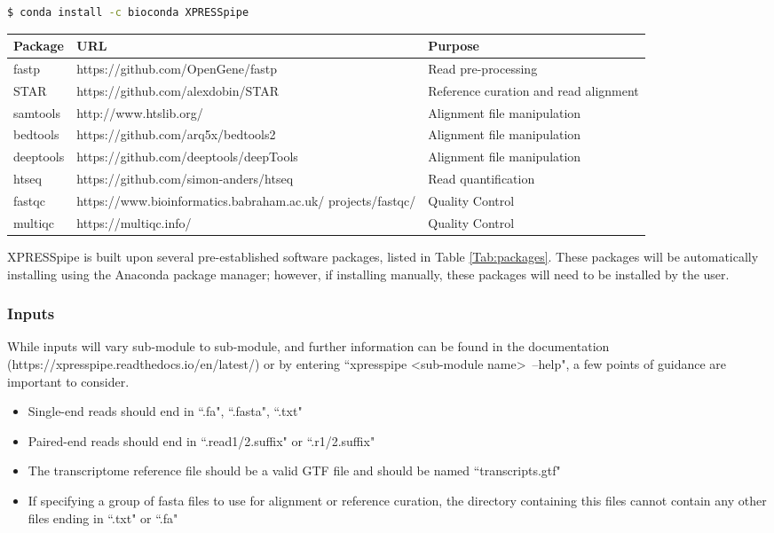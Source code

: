 \documentclass[11pt, a4paper, oneside]{article}
\begin{document}
\begin{lstlisting}[language=bash, caption=curateReference example]
$ conda install -c bioconda XPRESSpipe
\end{lstlisting}

\begin{tabular}{p{2.4cm}p{7.5cm}p{6.5cm}}
 \textbf{Package} & \textbf{URL} & \textbf{Purpose} \\
 \hline
 fastp & https://github.com/OpenGene/fastp & Read pre-processing \\
 \hline
 STAR & https://github.com/alexdobin/STAR & Reference curation and read alignment \\
 \hline
 samtools & http://www.htslib.org/ & Alignment file manipulation \\
 \hline
 bedtools & https://github.com/arq5x/bedtools2 & Alignment file manipulation \\
 \hline
 deeptools & https://github.com/deeptools/deepTools & Alignment file manipulation \\
 \hline
 htseq & https://github.com/simon-anders/htseq & Read quantification \\
 \hline
 fastqc & https://www.bioinformatics.babraham.ac.uk/ projects/fastqc/ & Quality Control \\
 \hline
 multiqc & https://multiqc.info/ & Quality Control \\
\end{tabular}
\newline

XPRESSpipe is built upon several pre-established software packages, listed in Table \ref{Tab:packages}. These packages will be automatically installing using the Anaconda package manager; however, if installing manually, these packages will need to be installed by the user.

\subsubsection{Inputs}
While inputs will vary sub-module to sub-module, and further information can be found in the documentation (https://xpresspipe.readthedocs.io/en/latest/) or by entering ``xpresspipe \textless sub-module name\textgreater \ --help", a few points of guidance are important to consider.

\begin{itemize}
\item Single-end reads should end in ``.fa", ``.fasta", ``.txt"
\item Paired-end reads should end in ``.read1/2.suffix" or ``.r1/2.suffix"
\item The transcriptome reference file should be a valid GTF file and should be named ``transcripts.gtf"
\item If specifying a group of fasta files to use for alignment or reference curation, the directory containing this files cannot contain any other files ending in ``.txt" or ``.fa"
\end{itemize}
\end{document}
